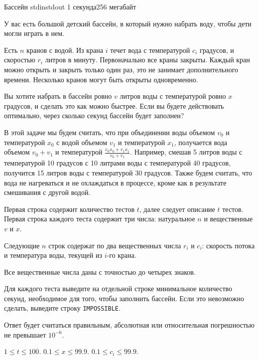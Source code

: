 
\begin{problem}{Бассейн}
{stdin}{stdout}
{1 секунда}{256 мегабайт}{}

У вас есть большой детский бассейн, в который нужно набрать воду, чтобы дети могли играть в нем.

Есть $n$ кранов с водой. Из крана $i$ течет вода с температурой $c_i$ градусов, и скоростью $r_i$ литров в минуту. Первоначально все краны закрыты. Каждый кран можно открыть и закрыть только один раз, это не занимает дополнительного времени. Несколько кранов могут быть открыты одновременно.

Вы хотите набрать в бассейн ровно $v$ литров воды с температурой ровно $x$ градусов, и сделать это как можно быстрее. Если вы будете действовать оптимально, через сколько секунд бассейн будет заполнен?

В этой задаче мы будем считать, что при объединении воды объемом $v_0$ и температурой $x_0$ с водой объемом $v_1$ и температурой $x_1$, получается вода объемом $v_0 + v_1$ и температурой $\frac{v_0 x_0 + v_1 x_1}{v_0 + v_1}$. Например, смешав 5 литров воды с температурой 10 градусов с 10 литрами воды с температурой 40 градусов, получится 15 литров воды с температурой 30 градусов. Также будем считать, что вода не нагреваться и не охлаждаться в процессе, кроме как в результате смешивания с другой водой.

\InputFile

Первая строка содержит количество тестов $t$, далее следует описание $t$ тестов.
Первая строка каждого теста содержит три числа: натуральное $n$ и вещественные $v$ и $x$.

Следующие $n$ строк содержат по два вещественных числа $r_i$ и $c_i$: скорость потока и температура воды, текущей из $i$-го крана. 

Все вещественные числа даны с точностью до четырех знаков.

\OutputFile

Для каждого теста выведите на отдельной строке минимальное количество секунд, необходимое для того, чтобы заполнить бассейн. Если это невозможно сделать, выведите строку \texttt{IMPOSSIBLE}.

Ответ будет считаться правильным, абсолютная или относительная погрешностью не превышает $10^{-6}$. 

\Scoring

$1\le t\le 100$.
$0.1\le x\le 99.9$.
$0.1\le c_i\le 99.9$.


\end{problem}
